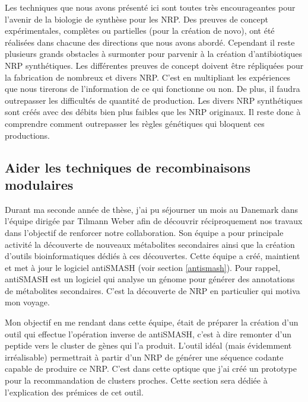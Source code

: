 Les techniques que nous avons présenté ici sont toutes très encourageantes pour l'avenir de la biologie de synthèse pour les NRP.
Des preuves de concept expérimentales, complètes ou partielles (pour la création de novo), ont été réalisées dans chacune des directions que nous avons abordé.
Cependant il reste plusieurs grands obstacles à surmonter pour parvenir à la création d'antibiotiques NRP synthétiques.
Les différentes preuves de concept doivent être répliquées pour la fabrication de nombreux et divers NRP.
C'est en multipliant les expériences que nous tirerons de l'information de ce qui fonctionne ou non.
De plus, il faudra outrepasser les difficultés de quantité de production.
Les divers NRP synthétiques sont créés avec des débits bien plus faibles que les NRP originaux.
Il reste donc à comprendre comment outrepasser les règles génétiques qui bloquent ces productions.


\subsection{Aider les techniques de recombinaisons modulaires}

Durant ma seconde année de thèse, j'ai pu séjourner un mois au Danemark dans l'équipe dirigée par Tilmann Weber afin de découvrir réciproquement nos travaux dans l'objectif de renforcer notre collaboration.
Son équipe a pour principale activité la découverte de nouveaux métabolites secondaires ainsi que la création d'outils bioinformatiques dédiés à ces découvertes.
Cette équipe a créé, maintient et met à jour le logiciel antiSMASH (voir section \ref{antismash}).
Pour rappel, antiSMASH est un logiciel qui analyse un génome pour générer des annotations de métabolites secondaires.
C'est la découverte de NRP en particulier qui motiva mon voyage.

Mon objectif en me rendant dans cette équipe, était de préparer la création d'un outil qui effectue l'opération inverse de antiSMASH, c'est à dire remonter d'un peptide vers le cluster de gènes qui l'a produit.
L'outil idéal (mais évidemment irréalisable) permettrait à partir d'un NRP de générer une séquence codante capable de produire ce NRP.
C'est dans cette optique que j'ai créé un prototype pour la recommandation de clusters proches.
Cette section sera dédiée à l'explication des prémices de cet outil.


